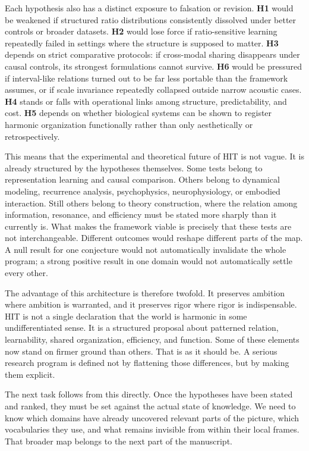 Each hypothesis also has a distinct exposure to falsation or revision. \textbf{H1} would be weakened if structured ratio distributions consistently dissolved under better controls or broader datasets. \textbf{H2} would lose force if ratio-sensitive learning repeatedly failed in settings where the structure is supposed to matter. \textbf{H3} depends on strict comparative protocols: if cross-modal sharing disappears under causal controls, its strongest formulations cannot survive. \textbf{H6} would be pressured if interval-like relations turned out to be far less portable than the framework assumes, or if scale invariance repeatedly collapsed outside narrow acoustic cases. \textbf{H4} stands or falls with operational links among structure, predictability, and cost. \textbf{H5} depends on whether biological systems can be shown to register harmonic organization functionally rather than only aesthetically or retrospectively.

This means that the experimental and theoretical future of HIT is not vague. It is already structured by the hypotheses themselves. Some tests belong to representation learning and causal comparison. Others belong to dynamical modeling, recurrence analysis, psychophysics, neurophysiology, or embodied interaction. Still others belong to theory construction, where the relation among information, resonance, and efficiency must be stated more sharply than it currently is. What makes the framework viable is precisely that these tests are not interchangeable. Different outcomes would reshape different parts of the map. A null result for one conjecture would not automatically invalidate the whole program; a strong positive result in one domain would not automatically settle every other.

The advantage of this architecture is therefore twofold. It preserves ambition where ambition is warranted, and it preserves rigor where rigor is indispensable. HIT is not a single declaration that the world is harmonic in some undifferentiated sense. It is a structured proposal about patterned relation, learnability, shared organization, efficiency, and function. Some of these elements now stand on firmer ground than others. That is as it should be. A serious research program is defined not by flattening those differences, but by making them explicit.

The next task follows from this directly. Once the hypotheses have been stated and ranked, they must be set against the actual state of knowledge. We need to know which domains have already uncovered relevant parts of the picture, which vocabularies they use, and what remains invisible from within their local frames. That broader map belongs to the next part of the manuscript.
